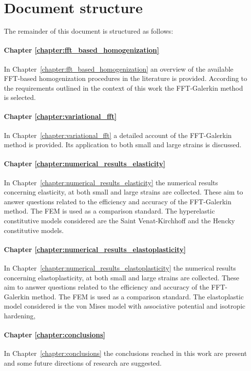 \section{Document structure}

The remainder of this document is structured as follows:

\paragraph{Chapter \ref{chapter:fft_based_homogenization}}
In Chapter~\ref{chapter:fft_based_homogenization} an overview of the available FFT-based homogenization procedures in the literature is provided.
According to the requirements outlined in the context of this work the FFT-Galerkin method is selected.

\paragraph{Chapter \ref{chapter:variational_fft}}
In Chapter~\ref{chapter:variational_fft} a detailed account of the FFT-Galerkin method is provided.
Its application to both small and large strains is discussed.

\paragraph{Chapter \ref{chapter:numerical_results_elasticity}}
In Chapter~\ref{chapter:numerical_results_elasticity} the numerical results concerning elasticity, at both small and large strains are collected.
These aim to answer questions related to the efficiency and accuracy of the FFT-Galerkin method.
The FEM is used as a comparison standard.
The hyperelastic constitutive models considered are the Saint Venat-Kirchhoff and the Hencky constitutive models.

\paragraph{Chapter \ref{chapter:numerical_results_elastoplasticity}}
In Chapter~\ref{chapter:numerical_results_elastoplasticity} the numerical results concerning elastoplasticity, at both small and large strains are collected.
These aim to answer questions related to the efficiency and accuracy of the FFT-Galerkin method.
The FEM is used as a comparison standard.
The elastoplastic model considered is the von  Mises  model  with  associative  potential  and  isotropic  hardening,

\paragraph{Chapter \ref{chapter:conclusions}}
In Chapter~\ref{chapter:conclusions} the conclusions reached in this work are present and some future directions of research are suggested.

\newpage\null\thispagestyle{blank}\newpage

